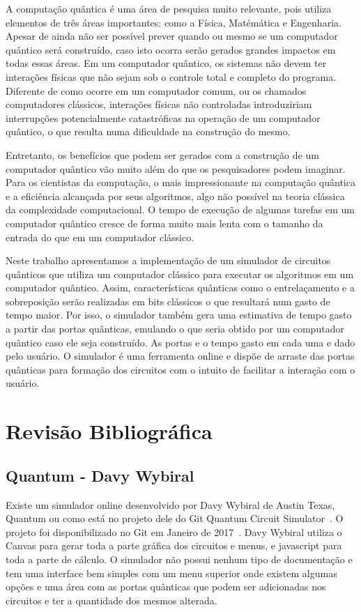 \documentclass[a4paper, 12pt, oneside]{book}
\begin{document}
A computação quântica é uma área de pesquisa muito relevante, pois utiliza elementos de três áreas importantes: como a Física, Matémática e Engenharia. Apesar de ainda não ser possível prever quando ou mesmo se um computador quântico será construído, caso isto ocorra serão gerados grandes impactos em todas essas áreas. Em um computador quântico, os sistemas não devem ter interações físicas que não sejam sob o controle total e completo do programa. Diferente de como ocorre em um computador comum, ou os chamados computadores clássicos, interações físicas não controladas introduziriam interrupções potencialmente catastróficas na operação de um computador quântico, o que resulta numa dificuldade na construção do mesmo. 

Entretanto, os benefícios que podem ser gerados com a construção de um computador quântico vão muito além do que os pesquisadores podem imaginar. Para os cientistas da computação, o mais impressionante na computação quântica e a eficiência alcançada por seus algoritmos, algo não possível na teoria clássica da complexidade computacional. O tempo de execução de algumas tarefas em um computador quântico cresce de forma muito mais lenta com o tamanho da entrada do que em um computador clássico. 

Neste trabalho apresentamos a implementação de um simulador de circuitos quânticos que utiliza um computador clássico para executar os algoritmos em um computador quântico. Assim, características quânticas como o entrelaçamento e a sobreposição serão realizadas em bits clássicos o que resultará num gasto de tempo maior. Por isso, o simulador também gera uma estimativa de tempo gasto a partir das portas quânticas, emulando o que seria obtido por um computador quântico caso ele seja construído. As portas e o tempo gasto em cada uma e dado pelo usuário. O simulador é uma ferramenta online e dispõe de arraste das portas quânticas para formação dos circuitos com o intuito de facilitar a interação com o usuário.

\section{Revisão Bibliográfica}

\subsection{Quantum - Davy Wybiral}

Existe um simulador online desenvolvido por Davy Wybiral de Austin Texas, Quantum ou como está no projeto dele do Git Quantum Circuit Simulator~\cite{davyw}. O projeto foi disponibilizado no Git em Janeiro de 2017~\cite{gitdavyw}. Davy Wybiral utiliza o Canvas para gerar toda a parte gráfica dos circuitos e menus, e javascript para toda a parte de cálculo. O simulador não possui nenhum tipo de documentação e tem uma interface bem simples com um menu superior onde existem algumas opções e uma área com as portas quânticas que podem ser adicionadas nos circuitos e ter a quantidade dos mesmos alterada.
\end{document}
